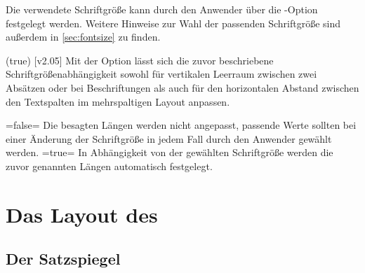 \begin{DeclareEntity*}{}
\begin{DeclareEntity*}{}
\begin{DeclareEntity*}{}
Die verwendete Schriftgröße kann durch den Anwender über die \KOMAScript-Option 
 festgelegt werden.
Weitere Hinweise zur Wahl der passenden Schriftgröße sind außerdem in 
\autoref{sec:fontsize} zu finden.

\begin{Declaration}
  {}
  (true)
  [v2.05]
\printdeclarationlist
%
Mit der Option  lässt sich die zuvor beschriebene 
Schriftgrößenabhängigkeit sowohl für vertikalen Leerraum zwischen zwei Absätzen 
oder bei Beschriftungen als auch für den horizontalen Abstand zwischen den 
Textspalten im mehrspaltigen Layout anpassen.
\begin{DeclareValues}
\itemval=false=
  Die besagten Längen werden nicht angepasst, passende Werte sollten bei einer 
  Änderung der Schriftgröße in jedem Fall durch den Anwender gewählt werden.
\itemval*=true=
  In Abhängigkeit von der gewählten Schriftgröße werden die zuvor genannten 
  Längen automatisch festgelegt.
\end{DeclareValues}
\end{Declaration}



\section{%
  Das Layout des \CDs%
}
\subsection{%
  Der Satzspiegel%
}

\end{DeclareEntity*}
\end{DeclareEntity*}
\end{DeclareEntity*}
